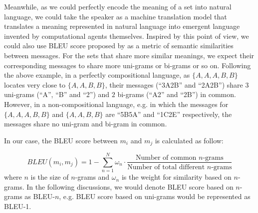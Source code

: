 Meanwhile, as we could perfectly encode the meaning of a set into natural language, we could take the speaker as a machine translation model that translates a meaning represented in natural language into emergent language invented by computational agents themselves. Inspired by this point of view, we could also use BLEU score proposed by \cite{papineni2002bleu} as a metric of semantic similarities between messages. For the sets that share more similar meanings, we expect their corresponding messages to share more uni-grams or bi-grams or so on. Following the above example, in a perfectly compositional language, as $\{A,A,A,B,B\}$ locates very close to $\{A,A,B,B\}$, their messages (``3A2B'' and ``2A2B'') share $3$ uni-grams (``A'', ``B'' and ``2'') and $2$ bi-grams (``A2'' and ``2B'') in common. However, in a non-compositional language, e.g. in which the messages for $\{A,A,A,B,B\}$ and $\{A,A,B,B\}$ are ``5B5A'' and ``1C2E'' respectively, the messages share no uni-gram and bi-gram in common.

In our case, the BLEU score between $m_i$ and $m_j$ is calculated as follow:

\begin{equation}
  BLEU(m_i, m_j) = 1 - \sum_{n=1}^{N} \omega_n \cdot \frac{\mbox{Number of common } n\mbox{-grams}}{\mbox{Number of total different } n\mbox{-grams}}
  \label{eq3.3.1:bleu_score}
\end{equation}
where $n$ is the size of $n$-grams and $\omega_n$ is the weight for similarity based on $n$-grams. In the following discussions, we would denote BLEU score based on $n$-grams as BLEU-$n$, e.g. BLEU score based on uni-grams would be represented as BLEU-1.



